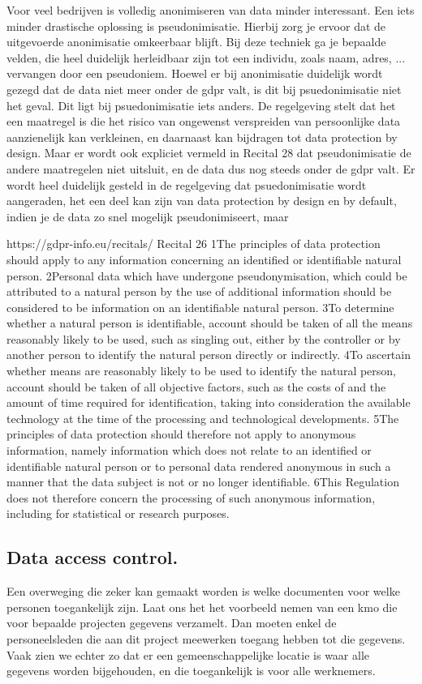 Voor veel bedrijven is volledig anonimiseren van data minder interessant. Een iets minder drastische oplossing is pseudonimisatie. Hierbij zorg je ervoor dat de uitgevoerde anonimisatie omkeerbaar blijft.  
Bij deze techniek ga je bepaalde velden, die heel duidelijk herleidbaar zijn tot een individu, zoals naam, adres, ... vervangen door een pseudoniem.
Hoewel er bij anonimisatie duidelijk wordt gezegd dat de data niet meer onder de gdpr valt, is dit bij psuedonimisatie niet het geval. Dit ligt bij psuedonimisatie iets anders. De regelgeving stelt dat het een maatregel is die het risico van ongewenst verspreiden van persoonlijke data aanzienelijk kan verkleinen, en daarnaast kan bijdragen tot data protection by design. Maar er wordt ook expliciet vermeld in Recital 28 dat pseudonimisatie de andere maatregelen niet uitsluit, en de data dus nog steeds onder de gdpr valt. 
Er wordt heel duidelijk gesteld in de regelgeving dat psuedonimisatie wordt aangeraden, het een deel kan zijn van data protection by design en by default, indien je de data zo snel mogelijk pseudonimiseert, maar 

https://gdpr-info.eu/recitals/
Recital 26
1The principles of data protection should apply to any information concerning an identified or identifiable natural person. 2Personal data which have undergone pseudonymisation, which could be attributed to a natural person by the use of additional information should be considered to be information on an identifiable natural person. 3To determine whether a natural person is identifiable, account should be taken of all the means reasonably likely to be used, such as singling out, either by the controller or by another person to identify the natural person directly or indirectly. 4To ascertain whether means are reasonably likely to be used to identify the natural person, account should be taken of all objective factors, such as the costs of and the amount of time required for identification, taking into consideration the available technology at the time of the processing and technological developments. 5The principles of data protection should therefore not apply to anonymous information, namely information which does not relate to an identified or identifiable natural person or to personal data rendered anonymous in such a manner that the data subject is not or no longer identifiable. 6This Regulation does not therefore concern the processing of such anonymous information, including for statistical or research purposes.


\subsection{Data access control.}
Een overweging die zeker kan gemaakt worden is welke documenten voor welke personen toegankelijk zijn. Laat ons het het voorbeeld nemen van een kmo die voor bepaalde projecten gegevens verzamelt. Dan moeten enkel de personeelsleden die aan dit project meewerken toegang hebben tot die gegevens.  Vaak zien we echter zo dat er een gemeenschappelijke locatie is waar alle gegevens worden bijgehouden, en die toegankelijk is voor alle werknemers. 

